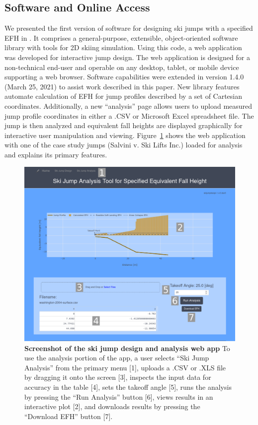 \documentclass[smallextended]{svjour3}       %
\begin{document}
\subsection{Software and Online Access}
\label{sec:software}
%
We presented the first version of software for designing ski jumps with a
specified EFH in \cite{Moore2018}. It comprises a general-purpose, extensible,
object-oriented software library with tools for 2D skiing simulation. Using
this code, a web application was developed for interactive jump design. The web
application is designed for a non-technical end-user and operable on any
desktop, tablet, or mobile device supporting a web browser.  Software
capabilities were extended in version 1.4.0 (March 25, 2021) to assist work
described in this paper. New library features automate calculation of EFH for
jump profiles described by a set of Cartesian coordinates. Additionally, a new
``analysis'' page allows users to upload measured jump profile coordinates in
either a .CSV or Microsoft Excel spreadsheet file. The jump is then analyzed
and equivalent fall heights are displayed graphically for interactive user
manipulation and viewing.  Figure~\ref{fig:web-app-screenshot} shows the web
application with one of the case study jumps (Salvini v. Ski Lifts Inc.) loaded
for analysis and explains its primary features.
%
\begin{figure}
  \centering
  \includegraphics[width=\columnwidth]{figures/web-app-screenshot.png}
  \caption{\textbf{Screenshot of the ski jump design and analysis web app} To
    use the analysis portion of the app, a user selects ``Ski Jump Analysis''
    from the primary menu [1], uploads a .CSV or .XLS file by dragging it onto
    the screen [3], inspects the input data for accuracy in the table [4], sets
    the takeoff angle [5], runs the analysis by pressing the ``Run Analysis''
    button [6], views results in an interactive plot [2], and downloads
     results by pressing the ``Download EFH'' button [7].}
  \label{fig:web-app-screenshot}
\end{figure}
\end{document}
